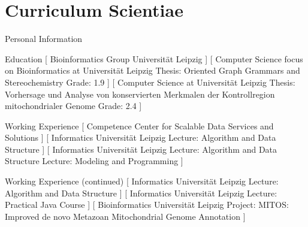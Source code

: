 
\newcommand{\colwidth}{9em}

\chapter{Curriculum Scientiae}

\begin{cscategory}[\colwidth]{Personal Information}
\end{cscategory}

\begin{cscategory}[\colwidth]{Education}
    [
        Bioinformatics Group Universität Leipzig
    ]
    [
        Computer Science focus on Bioinformatics at Universität Leipzig
        \bull Thesis: Oriented Graph Grammars and Stereochemistry
        \bull Grade: 1.9
    ]
    [
        Computer Science at Universität Leipzig
        \bull Thesis: Vorhersage und Analyse von konservierten Merkmalen der Kontrollregion mitochondrialer Genome
        \bull Grade: 2.4
    ]
\end{cscategory}

\begin{cscategory}[\colwidth]{Working Experience}
    [
    Competence Center for Scalable Data Services and Solutions
    ]
    [
    Informatics Universität Leipzig
    \bull Lecture: Algorithm and Data Structure
    ]
    [
    Informatics Universität Leipzig
    \bull Lecture: Algorithm and Data Structure
    \bull Lecture: Modeling and Programming
    ]
\end{cscategory}

\begin{cscategory}[\colwidth]{Working Experience (continued)}
    [
    Informatics Universität Leipzig
    \bull Lecture: Algorithm and Data Structure
    ]
    [
    Informatics Universität Leipzig
    \bull Lecture: Practical Java Course
    ]
    [
    Bioinformatics Universität Leipzig
        \bull Project: MITOS: Improved de novo Metazoan Mi\-to\-chon\-dri\-al
        Genome Annotation
    ]
\end{cscategory}

